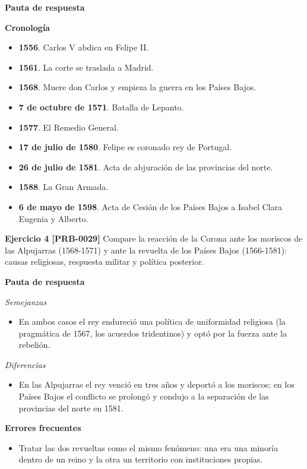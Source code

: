 \documentclass{book}
\begin{document}
\noindent\textbf{Pauta de respuesta}

\noindent\textbf{Cronología}
\begin{itemize}
\item \textbf{1556}. Carlos V abdica en Felipe II.
\item \textbf{1561}. La corte se traslada a Madrid.
\item \textbf{1568}. Muere don Carlos y empieza la guerra en los Países Bajos.
\item \textbf{7 de octubre de 1571}. Batalla de Lepanto.
\item \textbf{1577}. El Remedio General.
\item \textbf{17 de julio de 1580}. Felipe es coronado rey de Portugal.
\item \textbf{26 de julio de 1581}. Acta de abjuración de las provincias del norte.
\item \textbf{1588}. La Gran Armada.
\item \textbf{6 de mayo de 1598}. Acta de Cesión de los Países Bajos a Isabel Clara Eugenia y Alberto.
\end{itemize}

\noindent\textbf{Ejercicio 4 [PRB-0029]}
Compare la reacción de la Corona ante los moriscos de las Alpujarras (1568-1571) y ante la revuelta de los Países Bajos (1566-1581): causas religiosas, respuesta militar y política posterior.


\noindent\textbf{Pauta de respuesta}

\noindent\textit{Semejanzas}
\begin{itemize}
\item En ambos casos el rey endureció una política de uniformidad religiosa (la pragmática de 1567, los acuerdos tridentinos) y optó por la fuerza ante la rebelión.
\end{itemize}

\noindent\textit{Diferencias}
\begin{itemize}
\item En las Alpujarras el rey venció en tres años y deportó a los moriscos; en los Países Bajos el conflicto se prolongó y condujo a la separación de las provincias del norte en 1581.
\end{itemize}

\noindent\textbf{Errores frecuentes}
\begin{itemize}
\item Tratar las dos revueltas como el mismo fenómeno: una era una minoría dentro de un reino y la otra un territorio con instituciones propias.
\end{itemize}
\end{document}
